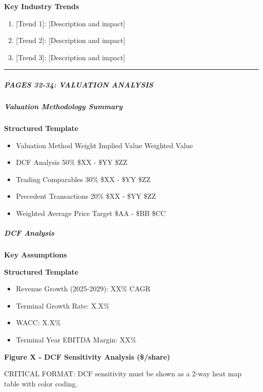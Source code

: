 \documentclass[11pt]{article}
\begin{document}
\textbf{Key Industry Trends}

\begin{enumerate}[leftmargin=*,itemsep=2pt,topsep=2pt]
\item {} [Trend 1]: [Description and impact]
\item {} [Trend 2]: [Description and impact]
\item {} [Trend 3]: [Description and impact]
\end{enumerate}

\vspace{0.5em}\hrule\vspace{0.5em}

\subparagraph{PAGES 32-34: VALUATION ANALYSIS}\mbox{}\par

\subparagraph{Valuation Methodology Summary}\mbox{}\par

\textbf{Structured Template}
\begin{itemize}[leftmargin=*,itemsep=2pt,topsep=2pt]
\item {} Valuation Method Weight Implied Value Weighted Value
\item {} DCF Analysis 50\% \$XX - \$YY \$ZZ
\item {} Trading Comparables 30\% \$XX - \$YY \$ZZ
\item {} Precedent Transactions 20\% \$XX - \$YY \$ZZ
\item {} Weighted Average Price Target \$AA - \$BB \$CC
\end{itemize}

\subparagraph{DCF Analysis}\mbox{}\par

\textbf{Key Assumptions}

\textbf{Structured Template}
\begin{itemize}[leftmargin=*,itemsep=2pt,topsep=2pt]
\item {} Revenue Growth (2025-2029): XX\% CAGR
\item {} Terminal Growth Rate: X.X\%
\item {} WACC: X.X\%
\item {} Terminal Year EBITDA Margin: XX\%
\end{itemize}

\textbf{Figure X - DCF Sensitivity Analysis (\$/share)}


CRITICAL FORMAT: DCF sensitivity must be shown as a 2-way heat map table with color coding.
\end{document}
